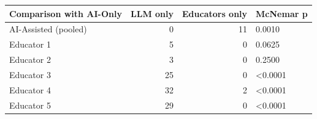 \begin{tabular}{lrrl}
\toprule
Comparison with AI-Only & LLM only & Educators only & McNemar p \\
\midrule
AI-Assisted (pooled) & 0 & 11 & 0.0010 \\
Educator 1 & 5 & 0 & 0.0625 \\
Educator 2 & 3 & 0 & 0.2500 \\
Educator 3 & 25 & 0 & <0.0001 \\
Educator 4 & 32 & 2 & <0.0001 \\
Educator 5 & 29 & 0 & <0.0001 \\
\bottomrule
\end{tabular}
